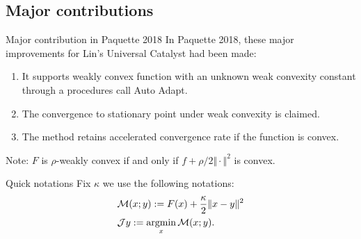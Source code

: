 \documentclass[11pt]{beamer}
\begin{document}
    \subsection{Major contributions}
        \begin{frame}{Major contribution in Paquette 2018}
            In Paquette 2018, these major improvements for Lin's Universal Catalyst had been made: 
            \begin{enumerate}
                \item It supports weakly convex function with an unknown weak convexity constant through a procedures call Auto Adapt. 
                \item The convergence to stationary point under weak convexity is claimed. 
                \item The method retains accelerated convergence rate if the function is convex. 
            \end{enumerate}
            Note: $F$ is $\rho$-weakly convex if and only if $f + \rho/2\Vert \cdot\Vert^2$ is convex. 
            \begin{block}{Quick notations}
                Fix $\kappa$ we use the following notations: 
                \begin{align*}
                & \mathcal M (x; y) := F(x) + \frac{\kappa}{2}\Vert x - y\Vert^2 
                \\
                & \mathcal J y := \mathop{\rm argmin}\limits_x \mathcal M (x; y). 
                \end{align*}
            \end{block}
        \end{frame}
\end{document}
